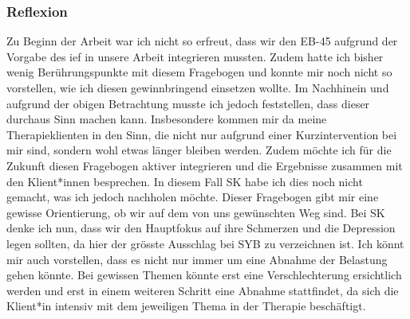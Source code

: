 \subsubsection{Reflexion}
Zu Beginn der Arbeit war ich nicht so erfreut, dass wir den EB-45 aufgrund der Vorgabe des \ac{ief} in unsere Arbeit integrieren mussten. Zudem hatte ich bisher wenig Berührungspunkte mit diesem Fragebogen und konnte mir noch nicht so vorstellen, wie ich diesen gewinnbringend einsetzen wollte. Im Nachhinein und aufgrund der obigen Betrachtung musste ich jedoch feststellen, dass dieser durchaus Sinn machen kann. Insbesondere kommen mir da meine Therapieklienten in den Sinn, die nicht nur aufgrund einer Kurzintervention bei mir sind, sondern wohl etwas länger bleiben werden. Zudem möchte ich für die Zukunft diesen Fragebogen aktiver integrieren und die Ergebnisse zusammen mit den Klient*innen besprechen. In diesem Fall SK habe ich dies noch nicht gemacht, was ich jedoch nachholen möchte. Dieser Fragebogen gibt mir eine gewisse Orientierung, ob wir auf dem von uns gewünschten Weg sind. Bei SK denke ich nun, dass wir den Hauptfokus auf ihre Schmerzen und die Depression legen sollten, da hier der grösste Ausschlag bei SYB zu verzeichnen ist. Ich könnt mir auch vorstellen, dass es nicht nur immer um eine Abnahme der Belastung gehen könnte. Bei gewissen Themen könnte erst eine Verschlechterung ersichtlich werden und erst in einem weiteren Schritt eine Abnahme stattfindet, da sich die Klient*in intensiv mit dem jeweiligen Thema in der Therapie beschäftigt.  









 
